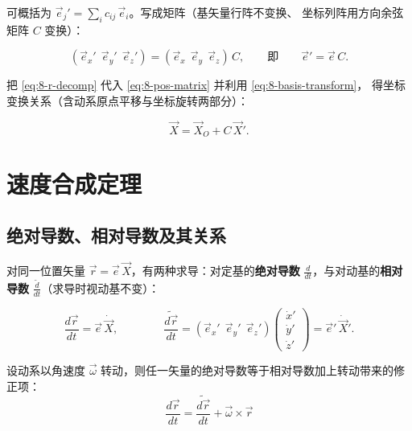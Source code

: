 可概括为 $\vec e_j' = \sum_i c_{ij}\,\vec e_i$。写成矩阵（基矢量行阵不变换、
坐标列阵用方向余弦矩阵 $C$ 变换）：

\begin{equation}\label{eq:8-basis-transform}
  (\vec e_x'\ \ \vec e_y'\ \ \vec e_z') = (\vec e_x\ \ \vec e_y\ \ \vec e_z)\,C,
  \qquad\text{即}\qquad \vec e' = \vec e\,C .
\end{equation}

把 \eqref{eq:8-r-decomp} 代入 \eqref{eq:8-pos-matrix} 并利用 \eqref{eq:8-basis-transform}，
得坐标变换关系（含动系原点平移与坐标旋转两部分）：

\begin{equation}\label{eq:8-coord-transform}
  \vec X = \vec X_O + C\,\vec X' .
\end{equation}

\section{速度合成定理}

\subsection{绝对导数、相对导数及其关系}

对同一位置矢量 $\vec r = \vec e\,\vec X$，有两种求导：对定基的\textbf{绝对导数}
$\frac{d}{dt}$，与对动基的\textbf{相对导数} $\frac{\widetilde{d}}{dt}$（求导时视动基不变）：

\begin{equation}\label{eq:8-deriv-defs}
  \frac{d\vec r}{dt} = \vec e\,\dot{\vec X},
  \qquad\qquad
  \frac{\widetilde{d\vec r}}{dt}
  = (\vec e_x'\ \ \vec e_y'\ \ \vec e_z')\begin{pmatrix}\dot x'\\\dot y'\\\dot z'\end{pmatrix}
  = \vec e'\,\dot{\vec X}' .
\end{equation}

\begin{proposition}[绝对导数与相对导数的关系]\label{prop:8-deriv}
设动系以角速度 $\vec\omega$ 转动，则任一矢量的绝对导数等于相对导数加上转动带来的修正项：
\begin{equation}\label{eq:8-deriv-rel}
  \boxed{\ \frac{d\vec r}{dt} = \frac{\widetilde{d\vec r}}{dt} + \vec\omega\times\vec r\ }
\end{equation}
\end{proposition}

